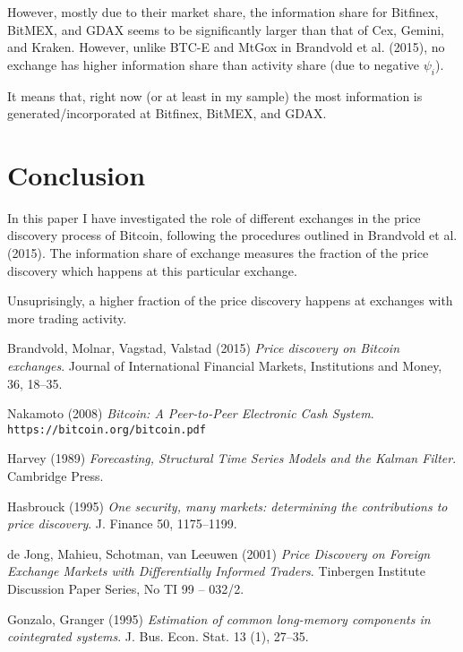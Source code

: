 \documentclass[a4paper,12pt]{article}
\begin{document}
    However, mostly due to their market share, the information share for Bitfinex, BitMEX, and GDAX seems to be significantly larger than that of Cex, Gemini, and Kraken. However, unlike BTC-E and MtGox in Brandvold et al. (2015), no exchange has higher information share than activity share (due to negative $\psi_i$).

    It means that, right now (or at least in my sample) the most information is generated/incorporated at Bitfinex, BitMEX, and GDAX.

  \section{Conclusion}
    In this paper I have investigated the role of different exchanges in the price discovery process of Bitcoin, following the procedures outlined in Brandvold et al. (2015). The information share of exchange measures the fraction of the price discovery which happens at this particular exchange.

    Unsuprisingly, a higher fraction of the price discovery happens at exchanges with more trading activity.

    \newpage
    \begin{thebibliography}{9}
        Brandvold, Molnar, Vagstad, Valstad (2015)
        \textit{Price discovery on Bitcoin exchanges}.
        Journal of International Financial Markets, Institutions and Money, 36, 18–35.

        Nakamoto (2008)
        \textit{Bitcoin: A Peer-to-Peer Electronic Cash System}.
        \\\texttt{https://bitcoin.org/bitcoin.pdf}

        Harvey (1989)
        \textit{Forecasting, Structural Time Series Models and the Kalman Filter}.
        Cambridge Press.

        Hasbrouck (1995)
        \textit{One security, many markets: determining the contributions to price discovery}.
        J. Finance 50, 1175–1199.

        de Jong, Mahieu, Schotman, van Leeuwen (2001)
        \textit{Price Discovery on Foreign Exchange Markets with Differentially Informed Traders}.
        Tinbergen Institute Discussion Paper Series, No TI 99 – 032/2.

        Gonzalo, Granger (1995)
        \textit{Estimation of common long-memory components in cointegrated systems}.
        J. Bus. Econ. Stat. 13 (1), 27–35.
    \end{thebibliography}
\end{document}
